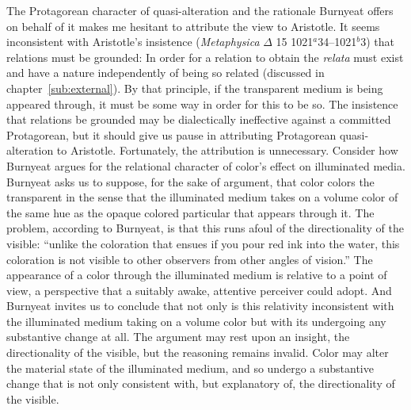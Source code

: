 The Protagorean character of quasi-alteration and the rationale Burnyeat offers on behalf of it makes me hesitant to attribute the view to Aristotle. It seems inconsistent with Aristotle's insistence (\emph{Metaphysica} \( \Delta \) 15 1021\( ^{a} \)34--1021\( ^{b} \)3) that relations must be grounded: In order for a relation to obtain the \emph{relata} must exist and have a nature independently of being so related (discussed in chapter~\ref{sub:external}). By that principle, if the transparent medium is being appeared through, it must be some way in order for this to be so. The insistence that relations be grounded may be dialectically ineffective against a committed Protagorean, but it should give us pause in attributing Protagorean quasi-alteration to Aristotle. Fortunately, the attribution is unnecessary. Consider how Burnyeat argues for the relational character of color's effect on illuminated media. Burnyeat asks us to suppose, for the sake of argument, that color colors the transparent in the sense that the illuminated medium takes on a volume color of the same hue as the opaque colored particular that appears through it. The problem, according to Burnyeat, is that this runs afoul of the directionality of the visible: ``unlike the coloration that ensues if you pour red ink into the water, this coloration is not visible to other observers from other angles of vision.'' The appearance of a color through the illuminated medium is relative to a point of view, a perspective that a suitably awake, attentive perceiver could adopt. And Burnyeat invites us to conclude that not only is this relativity inconsistent with the illuminated medium taking on a volume color but with its undergoing any substantive change at all. The argument may rest upon an insight, the directionality of the visible, but the reasoning remains invalid. Color may alter the material state of the illuminated medium, and so undergo a substantive change that is not only consistent with, but explanatory of, the directionality of the visible.

